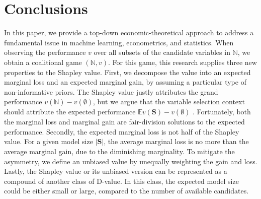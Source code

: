 \documentclass[a4paper,12pt]{article}
\begin{document}
\section{Conclusions}

\noindent 
In this paper, we provide a top-down economic-theoretical approach to address a fundamental issue in machine learning, econometrics, and statistics.
When observing the performance $v$ over all subsets of the candidate variables in $\mathbb{N}$, we obtain a coalitional game $(\mathbb{N}, v)$.
For this game, this research supplies three new properties to the Shapley value. 
First, we decompose the value into an expected marginal loss and an expected marginal gain, by assuming a particular type of non-informative priors. 
The Shapley value justly attributes the grand performance $v(\mathbb{N})-v(\emptyset)$, 
but we argue that the variable selection context should attribute the expected performance $\mathbb{E} v(\mathbf{S})-v(\emptyset)$ .
Fortunately, both the marginal loss and marginal gain are fair-division solutions to the expected performance.
Secondly, the expected marginal loss is not half of the Shapley value. 
For a given model size $|\mathbf{S}|$, the average marginal loss is no more than the average marginal gain, due to the diminishing marginality.
To mitigate the asymmetry, we define an unbiased value by unequally weighting the gain and loss.
Lastly, the Shapley value or its unbiased version can be represented as a compound of another class of D-value. 
In this class, the expected model size could be either small or large, compared to the number of available candidates.
\end{document}
